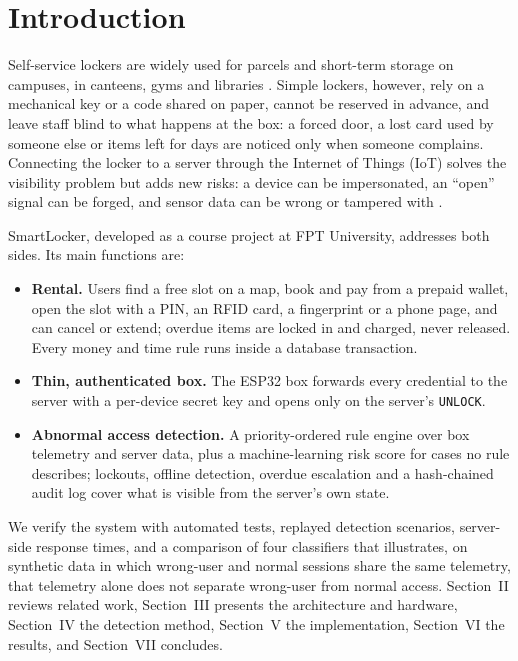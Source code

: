 \documentclass[conference, onecolumn]{IEEEtran}
\begin{document}
\section{Introduction}

Self-service lockers are widely used for parcels and short-term storage on campuses, in canteens, gyms and libraries
\cite{iwan2016parcel}. Simple lockers, however, rely on a mechanical key or a code shared on paper, cannot be reserved
in advance, and leave staff blind to what happens at the box: a forced door, a lost card used by someone else or items
left for days are noticed only when someone complains. Connecting the locker to a server through the Internet of Things
(IoT) \cite{alfuqaha2015iot} solves the visibility problem but adds new risks: a device can be impersonated, an
``open'' signal can be forged, and sensor data can be wrong or tampered with \cite{sicari2015security}.

SmartLocker, developed as a course project at FPT University, addresses both sides. Its main functions are:
\begin{itemize}
  \item \textbf{Rental.} Users find a free slot on a map, book and pay from a prepaid wallet, open the slot with a PIN,
        an RFID card, a fingerprint or a phone page, and can cancel or extend; overdue items are locked in and charged,
        never released. Every money and time rule runs inside a database transaction.
  \item \textbf{Thin, authenticated box.} The ESP32 box forwards every credential to the server with a per-device secret
        key and opens only on the server's \texttt{UNLOCK}.
  \item \textbf{Abnormal access detection.} A priority-ordered rule engine over box telemetry and server data, plus a
        machine-learning risk score for cases no rule describes; lockouts, offline detection, overdue escalation and a
        hash-chained audit log cover what is visible from the server's own state.
\end{itemize}
We verify the system with automated tests, replayed detection scenarios, server-side response times, and a comparison
of four classifiers that illustrates, on synthetic data in which wrong-user and normal sessions share the same
telemetry, that telemetry alone does not separate
wrong-user from normal access. Section~II reviews related work, Section~III
presents the architecture and hardware, Section~IV the detection method, Section~V the implementation, Section~VI the
results, and Section~VII concludes.
\end{document}
